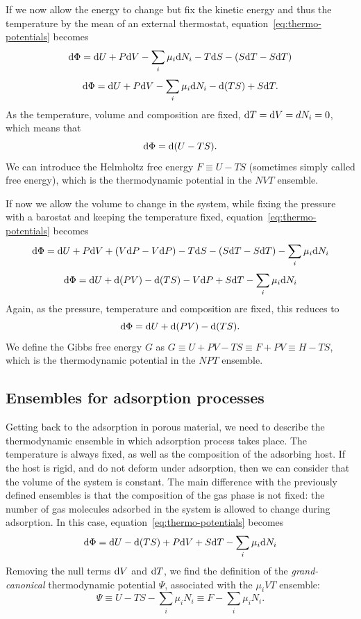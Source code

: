 \documentclass[thesis]{subfiles}
\begin{document}
If we now allow the energy to change but fix the kinetic energy and thus the
temperature by the mean of an external thermostat,
equation~\eqref{eq:thermo-potentials} becomes
\[\text{d} \Phi = \text{d} U + P \text{d} V - \sum_i \mu_i \text{d} N_i - T \text{d} S - (S \text{d} T - S \text{d} T) \]
\[\text{d} \Phi = \text{d} U + P \text{d} V - \sum_i \mu_i \text{d} N_i - \text{d} (TS) + S \text{d} T. \]
As the temperature, volume and composition are fixed, $\text{d} T = \text{d} V = d N_i = 0$,
which means that
\[\text{d} \Phi = \text{d} (U - TS).\]
We can introduce the Helmholtz free energy $F \equiv U - TS$ (sometimes simply
called free energy), which is the thermodynamic potential in the $NVT$ ensemble.

If now we allow the volume to change in the system, while fixing the pressure
with a barostat and keeping the temperature fixed,
equation~\eqref{eq:thermo-potentials} becomes
\[\text{d} \Phi = \text{d} U + P \text{d} V + (V\text{d} P - V\text{d} P) - T \text{d} S - (S\text{d} T - S\text{d} T) - \sum_i \mu_i \text{d} N_i\]
\[\text{d} \Phi = \text{d} U + \text{d} (PV) - \text{d}(TS) - V\text{d} P + S\text{d} T - \sum_i \mu_i \text{d} N_i\]
Again, as the pressure, temperature and composition are fixed, this reduces to
\[\text{d} \Phi = \text{d} U + \text{d} (PV) - \text{d}(TS).\]
We define the Gibbs free energy $G$ as $G \equiv U + PV - TS \equiv F + PV
\equiv H - TS$, which is the thermodynamic potential in the $NPT$ ensemble.

\subsection{Ensembles for adsorption processes}
\label{sec:osmotic-ensemble}

Getting back to the adsorption in porous material, we need to describe the
thermodynamic ensemble in which adsorption process takes place. The temperature
is always fixed, as well as the composition of the adsorbing host. If the host
is rigid, and do not deform under adsorption, then we can consider that the
volume of the system is constant. The main difference with the previously
defined ensembles is that the composition of the gas phase is not fixed:
the number of gas molecules adsorbed in the system is allowed to change during
adsorption. In this case, equation~\eqref{eq:thermo-potentials} becomes
\[\text{d} \Phi = \text{d} U - \text{d}(TS) + P\text{d} V + S\text{d} T - \sum_i \mu_i \text{d} N_i\]
Removing the null terms $\text{d} V$ and $\text{d} T$, we find the definition of the
\emph{grand-canonical} thermodynamic potential $\Psi$, associated with the
$\mu_iVT$ ensemble:
\[\Psi \equiv U - TS - \sum_i \mu_i N_i \equiv F - \sum_i \mu_i N_i.\]
\end{document}
